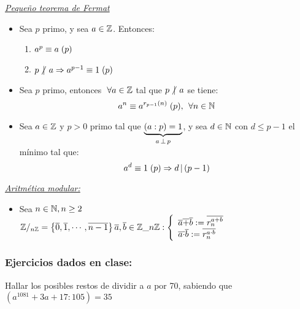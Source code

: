 \documentclass[12pt,a4paper, spanish]{article}
\begin{document}
\textit{\underline{Pequeño teorema de Fermat}}
\begin{itemize}
	\item Sea $p$ primo, y sea $a \en \enteros$. Entonces:
	      \begin{enumerate}[label=\arabic*.)]
		      \item $ \congruencia{a^p}{a}{p} $
		      \item $ p \noDivide a \entonces \congruencia{a^{p-1}}{1}{p} $
	      \end{enumerate}
	\item Sea $p$ primo, entonces $ \paratodo a \en \enteros$ tal que $ p \noDivide a$ se tiene:
	      \[
		      \congruencia{a^n}{a^{r_{p-1}(n)}}{p} ,\, \paratodo n \en \naturales
	      \]
	\item Sea $a \en \enteros$ y $p > 0$ primo tal que $\ub{(a:p) = 1}{a \cop p}$, y sea  $d \en \naturales$ con $d \leq p-1$
	      el mínimo tal que:
	      \[
		      \congruencia{a^d}{1}{p} \entonces d \divide (p-1)
	      \]
\end{itemize}
\textit{\underline{Aritmética modular:}}
\begin{itemize}
	\item Sea $n \en \naturales, n\geq2$\\
	      $
		      \enteros/_{n\enteros} = \set{\clase{0},\clase{1},\cdots, \clase{n-1} }\\
		      \clase{a},\clase{b} \en \enteros\_{n\enteros}:
		      \llave{l}{
		      \clase{a} \clase{+} \clase{b} := \overline{r_n^{a+b}} \\
		      \clase{a} \clase{\cdot} \clase{b} := \overline{r_n^{a\cdot b}}
		      }
	      $
\end{itemize}



\subsubsection*{Ejercicios dados en clase:}
\ejercicio Hallar los posibles restos de dividir a $a$ por 70,
sabiendo que $(a^{1081}+ 3a + 17 : 105) = 35$\\
\end{document}
